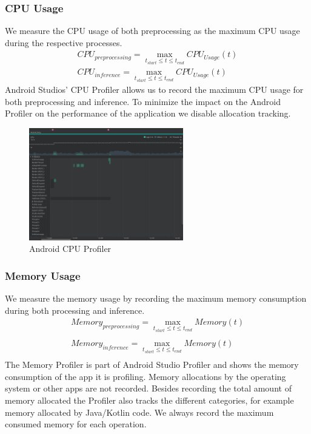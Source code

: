 \subsubsection{CPU Usage}
We measure the CPU usage of both preprocessing as the maximum CPU usage during the respective processes.
\begin{equation*}
\begin{gathered}
CPU_{preprocessing} = \max\limits_{t_{start} \leq t \leq t_{end}} CPU_{Usage}(t)\\
CPU_{inference} = \max\limits_{t_{start} \leq t \leq t_{end}} CPU_{Usage}(t)
\end{gathered}
\end{equation*}
Android Studios’ CPU Profiler allows us to record the maximum CPU usage for both preprocessing and inference. To minimize the impact on the Android Profiler on the performance of the application we disable allocation tracking.
\begin{figure}[H]
\centering  
\includegraphics[width=0.6\textwidth]{./Bilder/profiler_CPU}
\caption{Android CPU Profiler}
\label{fig:prof_cpu}
\end{figure}
\subsubsection{Memory Usage}
We measure the memory usage by recording the maximum memory consumption during both processing and inference.
\begin{equation*}
\begin{gathered}
Memory_{preprocessing} = \max\limits_{t_{start} \leq t \leq t_{end}} Memory(t)\\\\
Memory_{inference} = \max\limits_{t_{start} \leq t \leq t_{end}} Memory(t)\\
\end{gathered}
\end{equation*}
The Memory Profiler is part of Android Studio Profiler and shows the memory consumption of the app it is profiling. Memory allocations by the operating system or other apps are not recorded. Besides recording the total amount of memory allocated the Profiler also tracks the different categories, for example memory allocated by Java/Kotlin code. We always record the maximum consumed memory for each operation.

